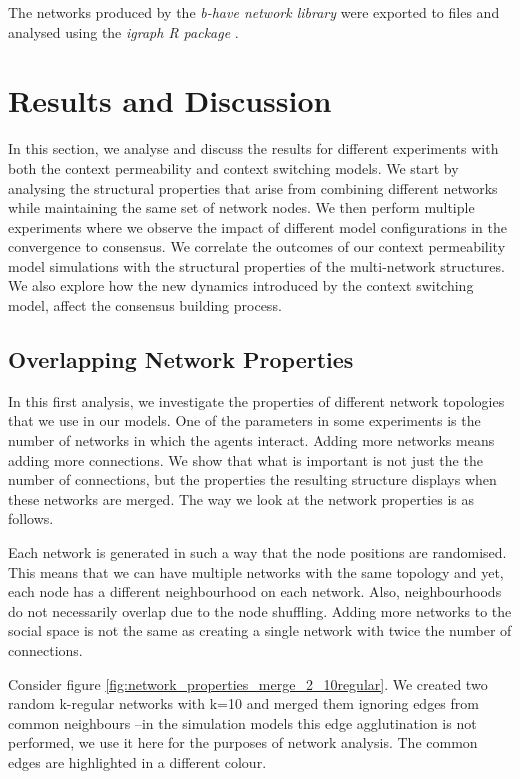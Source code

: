 \documentclass[preprint,number]{elsarticle}
\begin{document}
The networks produced by the \textit{b-have network library} \cite{Nunes:Software:11069} were exported to files and analysed using the \textit{igraph R package} \cite{igraph2006}. 

\section{Results and Discussion}
\label{sec:results-discussion}

\noindent In this section, we analyse and discuss the results for different experiments with both the
context permeability and context switching models. We start by analysing the structural properties
that arise from combining different networks while maintaining the same set of network nodes. We then perform multiple experiments where we observe the impact of different model configurations in the convergence to consensus. We correlate the outcomes of our context permeability model simulations with the structural properties of the multi-network structures. We also explore how the new dynamics introduced by the context switching model, affect the consensus building process. 

\subsection{Overlapping Network Properties}
\label{sec:network_properties}
\noindent In this first analysis, we investigate the properties of different network topologies that we use in our models. 
One of the parameters in some experiments is the number of networks in which the agents interact. Adding more networks means adding more connections. 
We show that what is important is not just the the number of connections, but the properties the resulting structure displays when these networks are merged. The way we look at the network properties is as follows.

Each network is generated in such a way that the node positions are randomised. This means that we can have multiple networks with the same topology and yet, each node has a different neighbourhood on each network. Also, neighbourhoods do not necessarily overlap due to the node shuffling. Adding more networks to the social space is not the same as creating a single network with twice the number of connections. 

\noindent Consider figure \ref{fig:network_properties_merge_2_10regular}. We created two random k-regular networks with k=10 and merged them ignoring edges from common neighbours --in the simulation models this edge agglutination is not performed, we use it here for the purposes of network analysis. The common edges are highlighted in a different colour.
\end{document}
